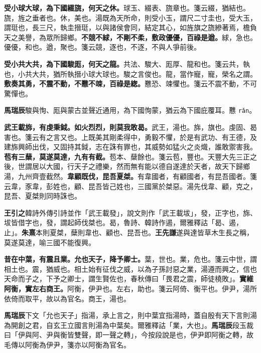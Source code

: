 \textbf{受小球大球，為下國綴旒，何天之休。}{\footnotesize 球玉、綴表、旒章也。箋云綴，猶結也。旒，旌之垂者也。休，美也。湯既為天所命，則受小玉，謂尺二寸圭也，受大玉，謂珽也，長三尺，執圭搢珽，以與諸侯會同，結定其心，如旌旗之旒縿著焉，檐負天之美譽，為眾所歸鄉。}\textbf{不競不絿，不剛不柔，敷政優優，百祿是遒。}{\footnotesize 絿，急也。優優，和也。遒，聚也。箋云競，逐也，不逐，不與人爭前後。}

\textbf{受小共大共，為下國駿厖，何天之龍。}{\footnotesize 共法、駿大、厖厚、龍和也。箋云共，執也，小共大共，猶所執搢小球大球也。駿之言俊也。龍，當作寵，寵，榮名之謂。}\textbf{敷奏其勇，不震不動，不戁不竦，百祿是緫。}{\footnotesize 戁恐、竦懼也。箋云不震不動，不可驚憚也。}

\begin{quoting}\textbf{馬瑞辰}駿與恂、厖與蒙古並聲近通用，為下國恂蒙，猶云為下國庇覆耳。戁 \texttt{rǎn}。\end{quoting}

\textbf{武王載旆，有虔秉鉞。如火烈烈，則莫我敢曷。}{\footnotesize 武王，湯也。旆，旗也。虔固、曷害也。箋云有之言又也。上既美其剛柔得中，勇毅不懼，於是有武功、有王德，及建旆興師出伐，又固持其鉞，志在誅有罪也，其威勢如猛火之炎熾，誰敢禦害我。}\textbf{苞有三蘖，莫遂莫達，九有有截。}{\footnotesize 苞本、蘖餘也。箋云苞，豐也。天豐大先三正之後，世謂居以大國，行天子之禮樂，然而無有能以德自遂達於天者，故天下歸鄉湯，九州齊壹截然。}\textbf{韋顧既伐，昆吾夏桀。}{\footnotesize 有韋國者，有顧國者，有昆吾國者。箋云韋，豕韋，彭姓也，顧、昆吾皆己姓也，三國黨於桀惡。湯先伐韋、顧，克之，昆吾、夏桀則同時誅也。}

\begin{quoting}\textbf{王引之}韓詩外傳引詩並作「武王載發」，說文則作「武王載坺」，發，正字也，旆、坺皆借字也，發，謂起師伐桀也。曷，魯詩、韓詩作遏，爾雅釋詁「曷、遏，止」。\textbf{朱熹}本則夏桀，蘖則韋也、顧也、昆吾也。\textbf{王先謙}遂與達皆草木生長之稱，莫遂莫達，喻三國不能復興。\end{quoting}

\textbf{昔在中葉，有震且業。允也天子，降予卿士。}{\footnotesize 葉，世也。業，危也。箋云中世，謂相土也。震，猶威也。相土始有征伐之威，以為子孫討惡之業，湯遵而興之，信也天命而子之，下予之卿士，謂生賢佐也，春秋傳曰「畏君之震，師徒橈敗」。}\textbf{實維阿衡，實左右商王。}{\footnotesize 阿衡，伊尹也。左右，助也。箋云阿倚、衡平也。伊尹，湯所依倚而取平，故以為官名。商王，湯也。}

\begin{quoting}\textbf{馬瑞辰}下文「允也天子」指湯，承上言之，則中葉宜指湯時，蓋自殷有天下言則湯為開創之君，自玄王立國言則湯為中葉矣。爾雅釋詁「業，大也」。\textbf{馬瑞辰}段玉裁曰「伊與阿、尹與衡皆雙聲，即一聲之轉」，今按段說是也，伊尹即阿衡之轉，故毛傳以阿衡為伊尹，箋亦以阿衡為官名。\end{quoting}


